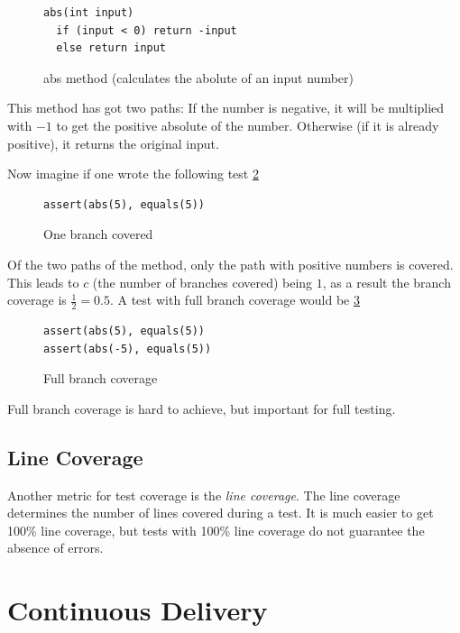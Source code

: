 \begin{figure}
\begin{lstlisting}
abs(int input)
  if (input < 0) return -input
  else return input
\end{lstlisting}
\caption{abs method (calculates the abolute of an input number)}
\label{code:branchCoverage}
\end{figure}

This method has got two paths: If the number is negative, it will
be multiplied with $-1$ to get the positive absolute of the number.
Otherwise (if it is already positive), it returns the original input.

Now imagine if one wrote the following test \ref{code:oneBranch}

\begin{figure}
\begin{lstlisting}
assert(abs(5), equals(5))
\end{lstlisting}
\caption{One branch covered}
\label{code:oneBranch}
\end{figure}

Of the two paths of the method, only the path with positive numbers is
covered. This leads to $c$ (the number of branches covered) being $1$,
as a result the branch coverage is $\frac{1}{2} = 0.5$. A test with
full branch coverage would be \ref{code:fullBranch}

\begin{figure}
\begin{lstlisting}
assert(abs(5), equals(5))
assert(abs(-5), equals(5))
\end{lstlisting}
\caption{Full branch coverage}
\label{code:fullBranch}
\end{figure}

Full branch coverage is hard to achieve, but important for full testing.

\subsection{Line Coverage}

Another metric for test coverage is the \textit{line coverage}. The line
coverage determines the number of lines covered during a test. It is much
easier to get 100\% line coverage, but tests with 100\% line coverage do
not guarantee the absence of errors.

\section{Continuous Delivery}

